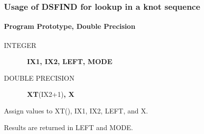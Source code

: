 \documentclass[twoside]{MATH77}
\begin{document}
\subsubsection{Usage of DSFIND for lookup in a knot sequence}

\paragraph{Program Prototype, Double Precision}
\begin{description}
\item[INTEGER]  \ {\bf IX1, IX2, LEFT, MODE}

\item[DOUBLE PRECISION]  \ {\bf XT}(IX2+1){\bf , X}
\end{description}
Assign values to XT(), IX1, IX2, LEFT, and X.
\begin{center}
\end{center}
Results are returned in LEFT and MODE.
\end{document}

